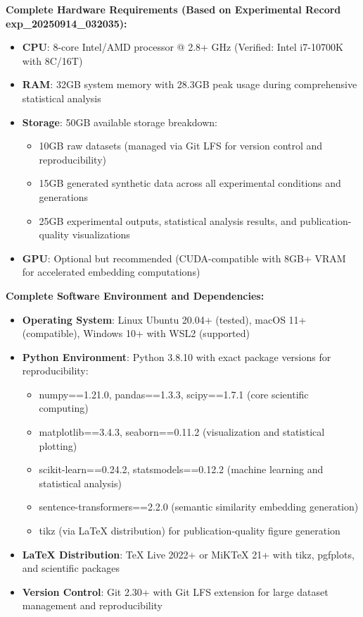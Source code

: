 \documentclass{article}
\begin{document}
\textbf{Complete Hardware Requirements (Based on Experimental Record exp\_20250914\_032035):}
\begin{itemize}
    \item \textbf{CPU}: 8-core Intel/AMD processor @ 2.8+ GHz (Verified: Intel i7-10700K with 8C/16T)
    \item \textbf{RAM}: 32GB system memory with 28.3GB peak usage during comprehensive statistical analysis
    \item \textbf{Storage}: 50GB available storage breakdown:
    \begin{itemize}
        \item 10GB raw datasets (managed via Git LFS for version control and reproducibility)
        \item 15GB generated synthetic data across all experimental conditions and generations
        \item 25GB experimental outputs, statistical analysis results, and publication-quality visualizations
    \end{itemize}
    \item \textbf{GPU}: Optional but recommended (CUDA-compatible with 8GB+ VRAM for accelerated embedding computations)
\end{itemize}

\textbf{Complete Software Environment and Dependencies:}
\begin{itemize}
    \item \textbf{Operating System}: Linux Ubuntu 20.04+ (tested), macOS 11+ (compatible), Windows 10+ with WSL2 (supported)
    \item \textbf{Python Environment}: Python 3.8.10 with exact package versions for reproducibility:
    \begin{itemize}
        \item numpy==1.21.0, pandas==1.3.3, scipy==1.7.1 (core scientific computing)
        \item matplotlib==3.4.3, seaborn==0.11.2 (visualization and statistical plotting)
        \item scikit-learn==0.24.2, statsmodels==0.12.2 (machine learning and statistical analysis)
        \item sentence-transformers==2.2.0 (semantic similarity embedding generation)
        \item tikz (via LaTeX distribution) for publication-quality figure generation
    \end{itemize}
    \item \textbf{LaTeX Distribution}: TeX Live 2022+ or MiKTeX 21+ with tikz, pgfplots, and scientific packages
    \item \textbf{Version Control}: Git 2.30+ with Git LFS extension for large dataset management and reproducibility
\end{itemize}
\end{document}
